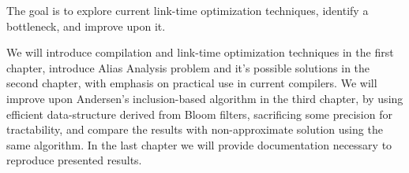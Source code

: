 The goal is to explore current link-time optimization techniques, identify a
bottleneck, and improve upon it.

We will introduce compilation and link-time optimization techniques in the
first chapter, introduce Alias Analysis problem and it's possible solutions in
the second chapter, with emphasis on practical use in current compilers. We
will improve upon Andersen's inclusion-based algorithm in the third chapter, by
using efficient data-structure derived from Bloom filters, sacrificing some
precision for tractability, and compare the results with non-approximate
solution using the same algorithm. In the last chapter we will provide
documentation necessary to reproduce presented results.



%
%
%
%
%
%
%
%

